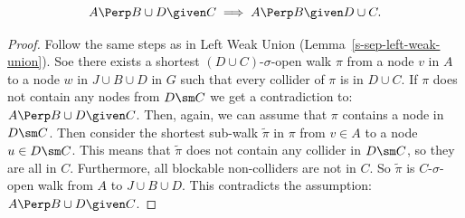 \begin{Lem} 
    \[A \Perp  B \cup  D \given C \implies A \Perp  B \given D \cup  C.\]
\begin{proof}
    Follow the same steps as in Left Weak Union (Lemma~\ref{s-sep-left-weak-union}). 
    Soe there exists a shortest $(D \cup C)$-$\sigma$-open walk $\pi$ 
    from a node $v$ in $A$ to a node $w$ in $J \cup B \cup D$ in $G$ such that every collider of $\pi$ is in $D \cup C$.
    If $\pi$ does not contain any nodes from $D \sm C$ we get a contradiction to: $A \Perp  B \cup  D \given C$.
    Then, again, we can assume that $\pi$ contains a node in $D \sm C$. 
    Then consider the shortest sub-walk $\tilde \pi$ in $\pi$ from $v \in A$ to a node $u \in D \sm C$.
    This means that $\tilde \pi$ does not contain any collider in $D\sm C$,
    so they are all in $C$. Furthermore, all blockable non-colliders are not in $C$. 
    So $\tilde \pi$ is $C$-$\sigma$-open walk from $A$ to $J \cup B \cup D$. 
    This contradicts the assumption: $A \Perp  B \cup D  \given C$.
\end{proof}
\end{Lem}

